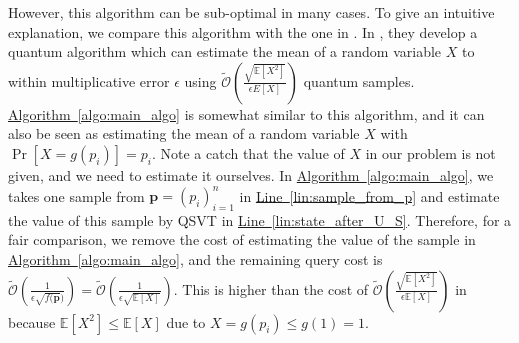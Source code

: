 \documentclass[journal]{IEEEtran}
\newcommand{\algo}[1]{\hyperref[algo:#1]{Algorithm~\ref*{algo:#1}}}
\newcommand{\lin}[1]{\hyperref[lin:#1]{Line~\ref*{lin:#1}}}
\newcommand{\E}{\mathbb{E}}
\newcommand{\xzw}[1]{{\color{blue}{Xinzhao: \textbf{#1}}}}
\newcommand{\syzn}[1]{{\color{violet}{#1}}}
\begin{document}
However, this algorithm can be sub-optimal in many cases. To  give an intuitive explanation, we compare this algorithm with the one in \cite{hamoudi2019Chebyshev}. In \cite{hamoudi2019Chebyshev}, they develop a quantum algorithm which can estimate the mean of a random variable $X$ to within multiplicative error $\epsilon$ using $\widetilde{\mathcal{O}}\left(\frac{\sqrt{\E[X^2]}}{\epsilon E[X]}\right)$ quantum samples. {\algo{main_algo}} is somewhat similar to this algorithm, and it can also be seen as estimating the mean of a random variable $X$ with %
$\Pr[X = g(p_i)] = p_i$. Note a catch %
that the value of $X$ in our problem is not given, and we need to estimate it ourselves. %
In \algo{main_algo}, we takes one sample from $\mathbf{p} = (p_i)_{i=1}^n$ in \lin{sample_from_p} and estimate the value of this sample by QSVT in \lin{state_after_U_S}. Therefore, for a fair comparison, we remove the cost of estimating the value of the sample in \algo{main_algo},  and
the remaining query cost is $\widetilde{\mathcal{O}}\left(\frac{1}{\epsilon \sqrt{f(\mathbf{p}})}\right) = \widetilde{\mathcal{O}}\left(\frac{1}{\epsilon \sqrt{\E[X]}}\right)$. This is higher than the cost of $\widetilde{\mathcal{O}}\left(\frac{\sqrt{\E[X^2]}}{\epsilon \E[X]}\right)$ in \cite{hamoudi2019Chebyshev} because $\E[X^2] \le \E[X]$ due to $X = g(p_i) \le g(1) = 1$.


\end{document}
